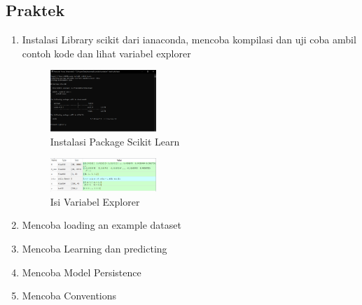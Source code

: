 \subsection{Praktek}
\begin{enumerate}
	\item Instalasi Library scikit dari ianaconda, mencoba kompilasi dan uji coba ambil contoh kode dan lihat variabel explorer
	\hfill\break
	\begin{figure}[H]
		\includegraphics[width=4cm]{figures/1174031/1/1.png}
		\centering
		\caption{Instalasi Package Scikit Learn}
	\end{figure}
	\begin{figure}[H]
		\includegraphics[width=4cm]{figures/1174031/1/2.png}
		\centering
		\caption{Isi Variabel Explorer}
	\end{figure}
	\item Mencoba loading an example dataset
	\hfill\break
	
	\item Mencoba Learning dan predicting
	\hfill\break
	
	\item Mencoba Model Persistence
	\hfill\break
	
	\item Mencoba Conventions
	\hfill\break
	
\end{enumerate}
